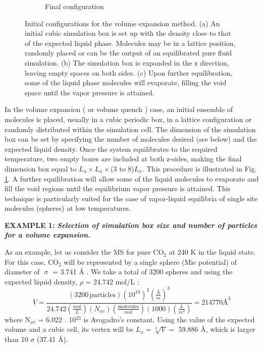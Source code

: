 \documentclass[9pt,bestpractices]{livecoms}
\begin{document}
\begin{figure}[h]
\begin{subfigure}{0.4\textwidth}
    \caption{Final configuration}
	\end{subfigure}
  \caption{Initial configurations for the volume expansion method. (a) An initial
cubic simulation box is set up with the density close to that of the expected
liquid phase. Molecules may be in a lattice position, randomly placed or can be
the output of an equilibrated pure fluid simulation. (b) The simulation box is
expanded in the z direction, leaving empty spaces on both sides. (c) Upon
further equilibration, some of the liquid phase molecules will evaporate,
filling the void space until the vapor pressure is attained.}
\label{fig:5}
\end{figure}

In the volume expansion ( or volume quench \citep{holcomb1993} ) case,
an initial ensemble of molecules is placed,  usually in a cubic periodic box,
in a lattice configuration or randomly distributed within the simulation cell.
The dimension of the simulation box can be set by specifying the number of
molecules desired (see below) and the expected liquid density. Once the system
equilibrates to the required temperature, two empty boxes are included at both
z-sides, making the final dimension box equal to $L_{x}
\times L_{x} \times$(3 to 8)$L_{x}$. This procedure is illustrated in Fig. \ref{fig:5}.
A further equilibration will
allow some of the liquid molecules to evaporate and fill the void regions until
the equilibrium vapor pressure is attained. This technique is particularly
suited for the case of vapor-liquid equilibria of single site molecules
(spheres) at low temperatures. 


\begin{mdframed}[linewidth=0pt,backgroundcolor=LiveCoMSLightBlue!8,fontcolor=LiveCoMSDarkBlue!80!black]
\textbf{EXAMPLE 1:} \textbf{\textit{Selection of simulation box size and number of particles for a volume expansion.}}

As an example, let us consider the MS for pure CO$_{2}$ at 240 K in the liquid
state. For this case, CO$_{2}$ will be represented by a single sphere (Mie
potential) of diameter of {${\upsigma}$} = 3.741 \AA{} \citep{avendano2011}. We take a total of 3200 spheres
and using the expected liquid density, ${\rho}$ = 24.742 mol/L \citep{lemmon2013}:
\begin{equation}
  V=\frac{\left(3200\,\textrm{particles}\right)\left(10^{10}\right)^{3}\left(\frac{\textrm{Å}}{m}\right)^{3}}{24.742\left(\frac{mol}{L}\right)\left(N_{av}\right)\left(\frac{\textrm{molecules}}{mol}\right)\left(1000\right)\left(\frac{L}{m^{3}}\right)}=214770\textrm{Å}^{3}
\end{equation}
where N$_{\mathrm{av}}$ = 6.022 . 10$^{23}$ is Avogadro's constant. Using the
value of the expected volume and a cubic cell, its vertex will be
$L_x = \sqrt[3]{V} = $ 59.886 \AA{}, which is larger than 10 $\sigma$  (37.41
\AA{}). 
\end{mdframed}
\end{document}
